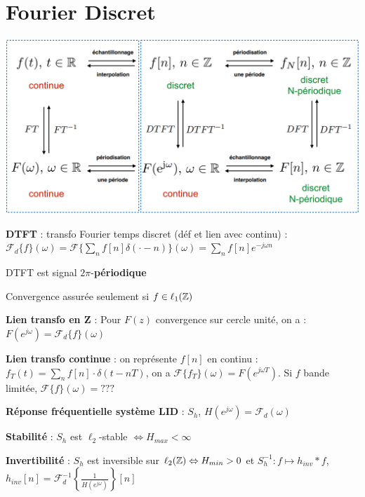 
\section*{Fourier Discret}

\begin{Figure}
    \includegraphics[width=\linewidth]{res/lien-transformees-fourier.png}
\end{Figure}

\textbf{DTFT} : transfo Fourier temps discret (déf et lien avec continu) : \\$\mathcal{F}_d\{f\}(\omega) = \mathcal{F}\{\sum_nf[n]\delta(\cdot-n)\}(\omega) = \sum_n f[n]e^{-j\omega n}$

\begin{myitemize}
    \item DTFT est signal $2\pi$-\textbf{périodique}
    \item Convergence assurée seulement si $f\in\ell_{1}(\mathbb{Z})$
\end{myitemize}

\textbf{Lien transfo en Z} : Pour $F(z)$ convergence sur cercle unité, on a : $F(e^ {j\omega}) = \mathcal{F}_d\{f\}(\omega)$

\textbf{Lien transfo continue} : on représente $f[n]$ en continu : $f_T(t) = \sum_n f[n] \cdot\delta(t-nT)$, on a $\mathcal{F}\{f_T\}(\omega) = F(e^{j\omega T})$. Si $f$ bande limitée, $\mathcal{F}\{f\}(\omega) = ???$

\textbf{Réponse fréquentielle système LID} : $S_h$, $H(e^{j\omega})=\mathcal{F}_d(\omega)$

\textbf{Stabilité} : $S_h$ est $\ell_2$-stable $\Leftrightarrow H_{max}<\infty$

\textbf{Invertibilité} : $S_h$ est inversible sur $\ell_{2}(\mathbb{Z}) \Leftrightarrow H_{min} > 0$ et $S_h^{-1}: f\mapsto h_{inv}*f$, $h_{inv}[n] = \mathcal{F}_d^{-1}\left\{\frac{1}{H(e^{j\omega})}\right\}[n]$ 

